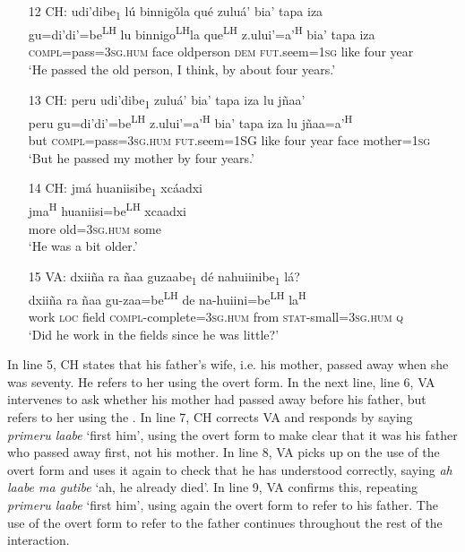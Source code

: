 \begin{itemize}
\item[12 CH:]
\glll udi'dibe\textsubscript{1} l\'{u} binnig\v{o}la qu\'{e} zulu\'{a}' bia' tapa iza  \\
gu=di'di'=be\textsuperscript{LH}  lu binnigo\textsuperscript{LH}la que\textsuperscript{LH} z.ului'=a'\textsuperscript{H} bia' tapa iza  \\
\textsc{compl}=pass=\textsc{3sg.hum} face oldperson \textsc{dem} \textsc{fut}.seem=\textsc{1sg} like four year  \\
\glt `He passed the old person, I think, by about four years.'


\item[13 CH:] 
\glll peru udi'dibe\textsubscript{1} zulu\'{a}' bia' tapa iza lu j\~{n}aa'  \\
peru gu=di'di'=be\textsuperscript{LH}  z.ului'=a'\textsuperscript{H} bia' tapa iza	lu j\~{n}aa=a'\textsuperscript{H}  \\
but \textsc{compl}=pass=\textsc{3sg.hum} \textsc{fut}.seem=1SG like four year face mother=\textsc{1sg}  \\
\glt `But he passed my mother by four years.'


\item[14 CH:]
\glll jm\'{a} huaniisibe\textsubscript{1} xc\'{a}adxi  \\
jma\textsuperscript{H}	huaniisi=be\textsuperscript{LH}  xcaadxi  \\
more old=\textsc{3sg.hum} some  \\
\glt `He was a bit older.'


\item[15 VA:]
dxii\~{n}a ra \~{n}aa guzaabe\textsubscript{1} d\'{e} nahuiinibe\textsubscript{1} l\'{a}?  \\
dxii\~{n}a ra \~{n}aa gu-zaa=be\textsuperscript{LH} de na-huiini=be\textsuperscript{LH} la\textsuperscript{H} \\
work \textsc{loc} field \textsc{compl}-complete=\textsc{3sg.hum} from \textsc{stat}-small=\textsc{3sg.hum} \textsc{q} \\
\glt `Did he work in the fields since he was little?'

\end{itemize}
\z

In line 5, CH states that his father's wife, i.e. his mother, passed away when she was seventy. He refers to her using the overt form. In the next line, line 6, VA intervenes to ask whether his mother had passed away before his father, but refers to her using the . In line 7, CH corrects VA and responds by saying \textit{primeru laabe} `first him', using the overt form to make clear that it was his father who passed away first, not his mother. In line 8, VA picks up on the use of the overt form and uses it again to check that he has understood correctly, saying \textit{ah laabe ma gutibe} `ah, he already died'. In line 9, VA confirms this, repeating \textit{primeru laabe} `first him', using again the overt form to refer to his father. The use of the overt form to refer to the father continues throughout the rest of the interaction.

